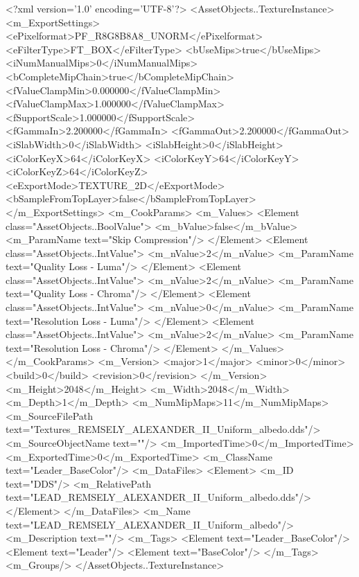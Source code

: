 <?xml version='1.0' encoding='UTF-8'?>
<AssetObjects..TextureInstance>
  <m_ExportSettings>
    <ePixelformat>PF_R8G8B8A8_UNORM</ePixelformat>
    <eFilterType>FT_BOX</eFilterType>
    <bUseMips>true</bUseMips>
    <iNumManualMips>0</iNumManualMips>
    <bCompleteMipChain>true</bCompleteMipChain>
    <fValueClampMin>0.000000</fValueClampMin>
    <fValueClampMax>1.000000</fValueClampMax>
    <fSupportScale>1.000000</fSupportScale>
    <fGammaIn>2.200000</fGammaIn>
    <fGammaOut>2.200000</fGammaOut>
    <iSlabWidth>0</iSlabWidth>
    <iSlabHeight>0</iSlabHeight>
    <iColorKeyX>64</iColorKeyX>
    <iColorKeyY>64</iColorKeyY>
    <iColorKeyZ>64</iColorKeyZ>
    <eExportMode>TEXTURE_2D</eExportMode>
    <bSampleFromTopLayer>false</bSampleFromTopLayer>
  </m_ExportSettings>
  <m_CookParams>
    <m_Values>
      <Element class="AssetObjects..BoolValue">
        <m_bValue>false</m_bValue>
        <m_ParamName text="Skip Compression"/>
      </Element>
      <Element class="AssetObjects..IntValue">
        <m_nValue>2</m_nValue>
        <m_ParamName text="Quality Loss - Luma"/>
      </Element>
      <Element class="AssetObjects..IntValue">
        <m_nValue>2</m_nValue>
        <m_ParamName text="Quality Loss - Chroma"/>
      </Element>
      <Element class="AssetObjects..IntValue">
        <m_nValue>0</m_nValue>
        <m_ParamName text="Resolution Loss - Luma"/>
      </Element>
      <Element class="AssetObjects..IntValue">
        <m_nValue>2</m_nValue>
        <m_ParamName text="Resolution Loss - Chroma"/>
      </Element>
    </m_Values>
  </m_CookParams>
  <m_Version>
    <major>1</major>
    <minor>0</minor>
    <build>0</build>
    <revision>0</revision>
  </m_Version>
  <m_Height>2048</m_Height>
  <m_Width>2048</m_Width>
  <m_Depth>1</m_Depth>
  <m_NumMipMaps>11</m_NumMipMaps>
  <m_SourceFilePath text="Textures\LEAD_REMSELY_ALEXANDER_II_Uniform_albedo.dds"/>
  <m_SourceObjectName text=""/>
  <m_ImportedTime>0</m_ImportedTime>
  <m_ExportedTime>0</m_ExportedTime>
  <m_ClassName text="Leader_BaseColor"/>
  <m_DataFiles>
    <Element>
      <m_ID text="DDS"/>
      <m_RelativePath text="LEAD_REMSELY_ALEXANDER_II_Uniform_albedo.dds"/>
    </Element>
  </m_DataFiles>
  <m_Name text="LEAD_REMSELY_ALEXANDER_II_Uniform_albedo"/>
  <m_Description text=""/>
  <m_Tags>
    <Element text="Leader_BaseColor"/>
    <Element text="Leader"/>
    <Element text="BaseColor"/>
  </m_Tags>
  <m_Groups/>
</AssetObjects..TextureInstance>
